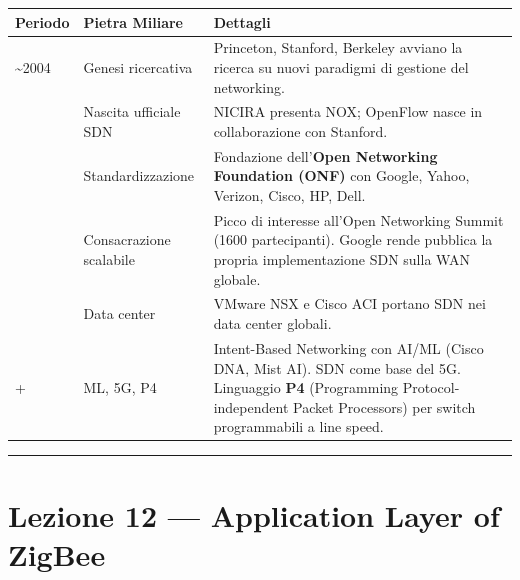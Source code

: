 \documentclass[
  italian,
  openany]{book}
\newcounter{none} %
\begin{document}
{\def\LTcaptype{none} %
\begin{longtable}[]{@{}
  >{\raggedright\arraybackslash}p{}
  >{\raggedright\arraybackslash}p{}
  >{\raggedright\arraybackslash}p{}@{}}
\toprule\noalign{}
\begin{minipage}[b]{\linewidth}\raggedright
\textbf{Periodo}
\end{minipage} & \begin{minipage}[b]{\linewidth}\raggedright
\textbf{Pietra Miliare}
\end{minipage} & \begin{minipage}[b]{\linewidth}\raggedright
\textbf{Dettagli}
\end{minipage} \\
\midrule\noalign{}
\endhead
\bottomrule\noalign{}
\endlastfoot
\textasciitilde2004 & Genesi ricercativa & Princeton, Stanford, Berkeley
avviano la ricerca su nuovi paradigmi di gestione del networking. \\
2008 & Nascita ufficiale SDN & NICIRA presenta NOX; OpenFlow nasce in
collaborazione con Stanford. \\
2011 & Standardizzazione & Fondazione dell'\textbf{Open Networking
Foundation (ONF)} con Google, Yahoo, Verizon, Cisco, HP, Dell. \\
2013 & Consacrazione scalabile & Picco di interesse all'Open Networking
Summit (1600 partecipanti). Google rende pubblica la propria
implementazione SDN sulla WAN globale. \\
2014 & Data center & VMware NSX e Cisco ACI portano SDN nei data center
globali. \\
2021+ & ML, 5G, P4 & Intent-Based Networking con AI/ML (Cisco DNA, Mist
AI). SDN come base del 5G. Linguaggio \textbf{P4} (Programming
Protocol-independent Packet Processors) per switch programmabili a line
speed. \\
\end{longtable}
}

\begin{center}\rule{0.5\linewidth}{0.5pt}\end{center}

\newpage

\chapter{Lezione 12 --- Application Layer of
ZigBee}\label{lezione-12-application-layer-of-zigbee}
\end{document}
